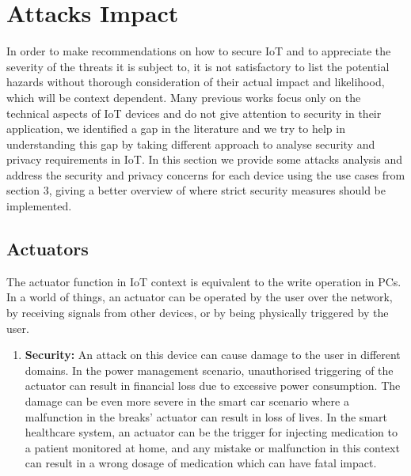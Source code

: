 \documentclass{llncs}
\begin{document}
\section{Attacks Impact}

In order to make recommendations on how to secure IoT and to appreciate the severity of the threats it is subject to, it is not satisfactory to list the potential hazards without thorough consideration of their actual impact and likelihood, which will be context dependent. Many previous works focus only on the technical aspects of IoT devices and do not give attention to security in their application, we identified a gap in the literature and we try to help in understanding this gap by taking different approach to analyse security and privacy requirements in IoT. In this section we provide some attacks analysis and address the security and privacy concerns for each device using the use cases from section 3, giving a better overview of where strict security measures should be implemented.

\subsection{Actuators}

The actuator function in IoT context is equivalent to the write operation in PCs. In a world of things, an actuator can be operated by the user over the network, by receiving signals from other devices, or by being physically triggered by the user.
\begin{enumerate} 
\item \textbf{Security:} An attack on this device can cause damage to the user in different domains. In the power management scenario, unauthorised triggering of the actuator can result in financial loss due to excessive power consumption. The damage can be even more severe in the smart car scenario where a malfunction in the breaks' actuator can result in loss of lives\cite{Koscher2010}. In the smart healthcare system, an actuator can be the trigger for injecting medication to a patient monitored at home, and any mistake or malfunction in this context can result in a wrong dosage of medication which can have fatal impact.
\end{enumerate}
\end{document}
